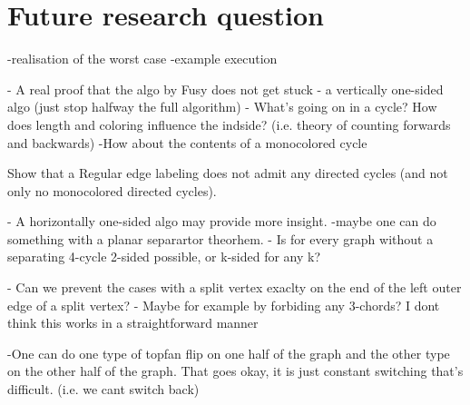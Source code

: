 \section{Future research question}

-realisation of the worst case
-example execution


- A real proof that the algo by Fusy does not get stuck
- a vertically one-sided algo (just stop halfway the full algorithm)
- What's going on in a cycle? How does length and coloring influence the indside? (i.e. theory of counting forwards and backwards)
  -How about the contents of a monocolored cycle

Show that a Regular edge labeling does not admit any directed cycles (and not only no monocolored directed cycles).

- A horizontally one-sided algo may provide more insight.
-maybe one can do something with a planar separartor theorhem.
- Is for every graph without a separating 4-cycle 2-sided possible, or k-sided for any k?

- Can we prevent the cases with a split vertex exaclty on the end of the left outer edge of a split vertex?
      - Maybe for example by forbiding any 3-chords? I dont think this works in a straightforward manner

-One can do one type of topfan flip on one half of the graph and the other type on the other half of the graph. That goes okay, it is just constant switching that's difficult. (i.e. we cant switch back)
